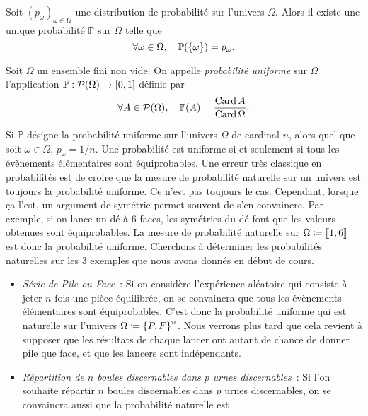 \documentclass{magnolia}
\begin{document}
\begin{proposition}
Soit $(p_\omega)_{\omega\in\Omega}$ une distribution de probabilité sur l'univers $\Omega$. Alors il existe une
unique probabilité $\mathbb{P}$ sur $\Omega$ telle que
\[\forall \omega\in\Omega,\quad \mathbb{P}(\left\{\omega\right\})=p_{\omega}.\]
\end{proposition}

\begin{definition}
Soit $\Omega$ un ensemble fini non vide. On appelle \emph{probabilité uniforme} sur $\Omega$
l'application $\mathbb{P}:\mathcal{P}(\Omega)\to\left[0,1\right]$ définie par
\[\forall A\in\mathcal{P}(\Omega),\quad \mathbb{P}(A)=\frac{\operatorname{Card} A}{\operatorname{Card} \Omega}.\] 
\end{definition}

\begin{remarques}
\remarque Si $\mathbb{P}$ désigne la probabilité uniforme sur l'univers $\Omega$ de cardinal $n$, alors
  quel que soit $\omega\in\Omega$, $p_\omega=1/n$.
\remarque Une probabilité est uniforme si et seulement si tous les évènements élémentaires sont équiprobables.
  Une erreur très classique en probabilités est de croire que la mesure de probabilité \og naturelle \fg
  sur un univers est toujours la probabilité uniforme. Ce n'est pas toujours le cas. Cependant, lorsque ça l'est,
  un argument de symétrie permet souvent de s'en convaincre.
  Par exemple, si on lance un dé à 6 faces, les symétries du dé font que les valeurs obtenues sont
  équiprobables. La mesure de probabilité \og naturelle \fg sur $\Omega\coloneqq\left\llbracket 1,6\right\rrbracket$ est donc la probabilité
  uniforme.
\remarque Cherchons à déterminer les probabilités \og naturelles \fg sur les 3 exemples que nous avons
  donnés en début de cours.
  \begin{itemize}
  \item \emph{Série de Pile ou Face}~: Si on considère l'expérience aléatoire qui consiste à jeter $n$ fois une
    pièce équilibrée, on se convaincra que tous les évènements élémentaires sont équiprobables. C'est donc la
    probabilité uniforme qui est naturelle sur l'univers $\Omega\coloneqq\left\{P,F\right\}^n$. Nous verrons plus tard que cela
    revient à supposer que les
    résultats de chaque lancer ont autant de chance de donner pile que face, et que les lancers sont indépendants.
  \item \emph{Répartition de $n$ boules discernables dans $p$ urnes discernables}~: Si l'on souhaite répartir
    $n$ boules discernables dans $p$ urnes discernables, on se convaincra aussi que la probabilité naturelle est

\end{itemize}
\end{remarques}
\end{document}
